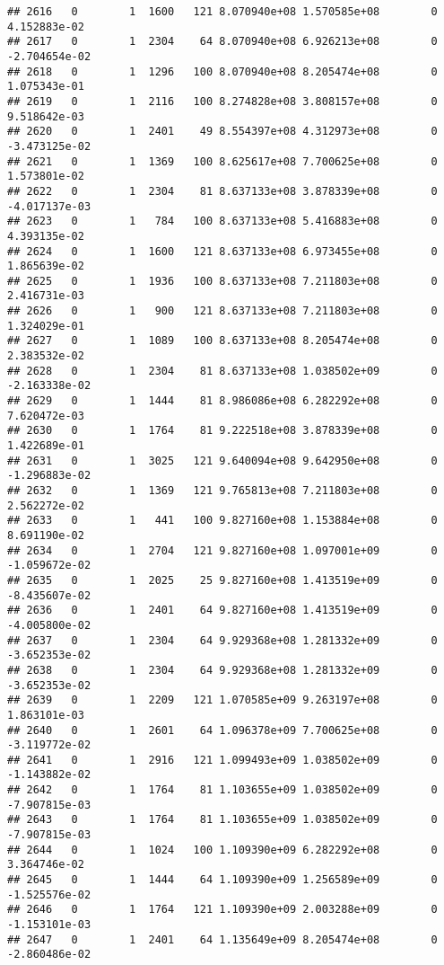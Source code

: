 \documentclass[
]{article}
\begin{document}
\begin{enumerate}
\begin{verbatim}
## 2616   0        1  1600   121 8.070940e+08 1.570585e+08        0  4.152883e-02
## 2617   0        1  2304    64 8.070940e+08 6.926213e+08        0 -2.704654e-02
## 2618   0        1  1296   100 8.070940e+08 8.205474e+08        0  1.075343e-01
## 2619   0        1  2116   100 8.274828e+08 3.808157e+08        0  9.518642e-03
## 2620   0        1  2401    49 8.554397e+08 4.312973e+08        0 -3.473125e-02
## 2621   0        1  1369   100 8.625617e+08 7.700625e+08        0  1.573801e-02
## 2622   0        1  2304    81 8.637133e+08 3.878339e+08        0 -4.017137e-03
## 2623   0        1   784   100 8.637133e+08 5.416883e+08        0  4.393135e-02
## 2624   0        1  1600   121 8.637133e+08 6.973455e+08        0  1.865639e-02
## 2625   0        1  1936   100 8.637133e+08 7.211803e+08        0  2.416731e-03
## 2626   0        1   900   121 8.637133e+08 7.211803e+08        0  1.324029e-01
## 2627   0        1  1089   100 8.637133e+08 8.205474e+08        0  2.383532e-02
## 2628   0        1  2304    81 8.637133e+08 1.038502e+09        0 -2.163338e-02
## 2629   0        1  1444    81 8.986086e+08 6.282292e+08        0  7.620472e-03
## 2630   0        1  1764    81 9.222518e+08 3.878339e+08        0  1.422689e-01
## 2631   0        1  3025   121 9.640094e+08 9.642950e+08        0 -1.296883e-02
## 2632   0        1  1369   121 9.765813e+08 7.211803e+08        0  2.562272e-02
## 2633   0        1   441   100 9.827160e+08 1.153884e+08        0  8.691190e-02
## 2634   0        1  2704   121 9.827160e+08 1.097001e+09        0 -1.059672e-02
## 2635   0        1  2025    25 9.827160e+08 1.413519e+09        0 -8.435607e-02
## 2636   0        1  2401    64 9.827160e+08 1.413519e+09        0 -4.005800e-02
## 2637   0        1  2304    64 9.929368e+08 1.281332e+09        0 -3.652353e-02
## 2638   0        1  2304    64 9.929368e+08 1.281332e+09        0 -3.652353e-02
## 2639   0        1  2209   121 1.070585e+09 9.263197e+08        0  1.863101e-03
## 2640   0        1  2601    64 1.096378e+09 7.700625e+08        0 -3.119772e-02
## 2641   0        1  2916   121 1.099493e+09 1.038502e+09        0 -1.143882e-02
## 2642   0        1  1764    81 1.103655e+09 1.038502e+09        0 -7.907815e-03
## 2643   0        1  1764    81 1.103655e+09 1.038502e+09        0 -7.907815e-03
## 2644   0        1  1024   100 1.109390e+09 6.282292e+08        0  3.364746e-02
## 2645   0        1  1444    64 1.109390e+09 1.256589e+09        0 -1.525576e-02
## 2646   0        1  1764   121 1.109390e+09 2.003288e+09        0 -1.153101e-03
## 2647   0        1  2401    64 1.135649e+09 8.205474e+08        0 -2.860486e-02

\end{verbatim}
\end{enumerate}
\end{document}
